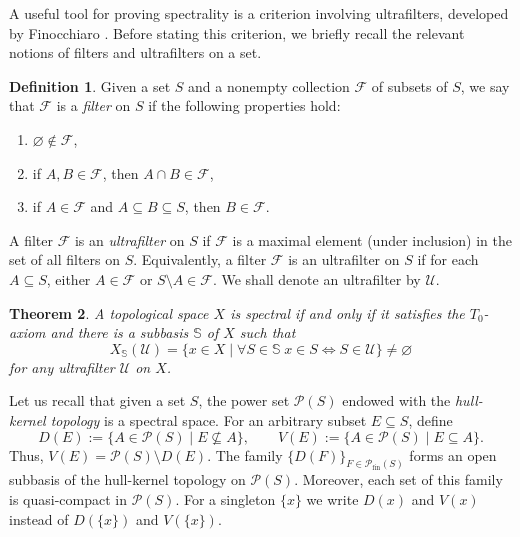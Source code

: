 \documentclass[10pt, reqno]{amsart}
\theoremstyle{plain}
\newtheorem{theorem}{Theorem}[section]
\theoremstyle{definition}
\newtheorem{definition}[theorem]{Definition}
\begin{document}
A useful tool for proving spectrality is a criterion involving ultrafilters, developed by Finocchiaro \cite{Finocchiaro03042014}. Before stating this criterion, we briefly recall the relevant notions of filters and ultrafilters on a set. 
\begin{definition}
    Given a set $S$ and a nonempty collection $\mathscr{F}$ of subsets of $S$, we say that $\mathscr{F}$ is a \emph{filter} on $S$ if the following properties hold: 
    \begin{enumerate}[label=(\arabic*)]
    \item $\varnothing \not\in\mathscr{F}$, 
    \item if $A, B \in \mathscr{F}$, then $A \cap B \in \mathscr{F}$, 
    \item if $A \in \mathscr{F}$ and $A \subseteq B \subseteq S$, then $B \in \mathscr{F}$. 
    \end{enumerate}
\end{definition}
\noindent A filter $\mathscr{F}$ is an \emph{ultrafilter} on $S$ if $\mathscr{F}$ is a maximal element (under inclusion) in the set of all filters on $S$. Equivalently, a filter $\mathscr{F}$ is an ultrafilter on $S$ if for each $A \subseteq S$, either $A \in\mathscr{F}$ or $S\setminus A \in\mathscr{F}$. We shall denote an ultrafilter by $\mathscr{U}$. 

\begin{theorem}\cite[Corollary 3.3]{Finocchiaro03042014}\label{ultrafilter_criterion}
    A topological space $X$ is spectral if and only if it satisfies the $T_0$-axiom and there is a subbasis $\mathbb{S}$ of $X$ such that 
    \begin{equation*}
        X_{\mathbb{S}}(\mathscr{U}) = \{x \in X \mid \forall S\in\mathbb{S} \hspace{3pt} x\in S \iff S \in\mathscr{U}\} \neq \varnothing
    \end{equation*}
    for any ultrafilter $\mathscr{U}$ on $X$. 
\end{theorem}

Let us recall that given a set $S$, the power set $\mathcal{P}(S)$ endowed with the \emph{hull-kernel topology} is a spectral space. For an arbitrary subset $E \subseteq S$, define
\begin{equation*}
    D(E) := \{A \in \mathcal{P}(S) \mid E \nsubseteq A\}, \qquad V(E) := \{A \in \mathcal{P}(S) \mid E \subseteq A\}. 
\end{equation*}
Thus, $V(E) = \mathcal{P}(S) \setminus D(E)$. The family $\{D(F)\}_{F\in\mathcal{P}_\mathrm{fin}(S)}$ forms an open subbasis of the hull-kernel topology on $\mathcal{P}(S)$. Moreover, each set of this family is quasi-compact in $\mathcal{P}(S)$. For a singleton $\{x\}$ we write $D(x)$ and $V(x)$ instead of $D(\{x\})$ and $V(\{x\})$. 
\end{document}
